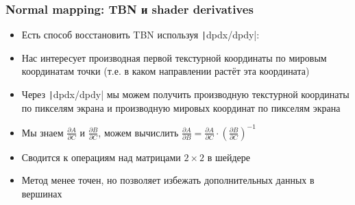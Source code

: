 \documentclass[10pt]{beamer}
\begin{document}
\begin{frame}[fragile]
\frametitle{Normal mapping: TBN и shader derivatives}
\begin{itemize}
\item Есть способ восстановить TBN используя \texttt|dpdx/dpdy|:
\pause
\item Нас интересует производная первой текстурной координаты по мировым координатам точки (т.е. в каком направлении растёт эта координата)
\pause
\item Через \texttt|dpdx/dpdy| мы можем получить производную текстурной координаты по пикселям экрана и производную мировых координат по пикселям экрана
\pause
\item Мы знаем \begin{math}\frac{\partial A}{\partial C}\end{math} и \begin{math}\frac{\partial B}{\partial C}\end{math}, можем вычислить \begin{math}\frac{\partial A}{\partial B} = \frac{\partial A}{\partial C} \cdot \left(\frac{\partial B}{\partial C}\right)^{-1}\end{math}
\pause
\item Сводится к операциям над матрицами \begin{math}2\times 2\end{math} в шейдере
\pause
\item Метод менее точен, но позволяет избежать дополнительных данных в вершинах
\end{itemize}
\end{frame}
\end{document}
